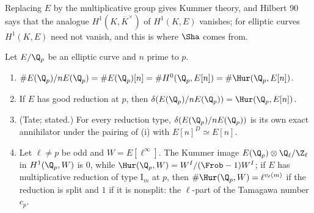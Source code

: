 \noindent Replacing $E$ by the multiplicative group gives Kummer theory, and Hilbert 90 says that the analogue $H^1(K,\overline K^\times)$ of $H^1(K,E)$ vanishes; for
elliptic curves $H^1(K,E)$ need not vanish, and this is where $\Sha$ comes from.

\begin{proposition}\label{prop:galcoh:ec-local-image}
Let $E/\Q_p$ be an elliptic curve and $n$ prime to $p$.
\begin{enumerate}[label=(\roman*)]
\item $\#E(\Q_p)/nE(\Q_p)=\#E(\Q_p)[n]=\#H^0(\Q_p,E[n])=\#\Hur(\Q_p,E[n])$.
\item If $E$ has good reduction at $p$, then $\delta(E(\Q_p)/nE(\Q_p))=\Hur(\Q_p,E[n])$.
\item (Tate; stated.) For every reduction type, $\delta(E(\Q_p)/nE(\Q_p))$ is its own exact annihilator under the pairing of (i) with
$E[n]^D\simeq E[n]$.
\item Let $\ell\ne p$ be odd and $W=E[\ell^\infty]$. The Kummer image $E(\Q_p)\otimes\Q_\ell/\Z_\ell$ in $H^1(\Q_p,W)$ is $0$, while $\Hur(\Q_p,W)=W^I/(\Frob-1)W^I$; if $E$ has
multiplicative reduction of type $\mathrm I_m$ at $p$, then $\#\Hur(\Q_p,W)=\ell^{v_\ell(m)}$ if the reduction is split and $1$ if it is nonsplit: the $\ell$-part of the
Tamagawa number $c_p$.
\end{enumerate}
\end{proposition}

